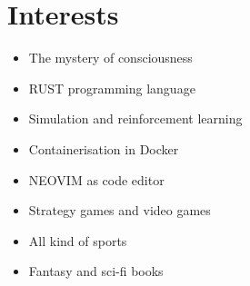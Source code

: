 \documentclass[
	12pt, %
]{../templates/FreemanCV}
\begin{document}
\section{Interests}
\begin{paracol}{2} %
  \begin{itemize}
    \item The mystery of consciousness
    \item RUST programming language
    \item Simulation and reinforcement learning
    \item Containerisation in Docker
  \end{itemize}
\switchcolumn %
\begin{itemize}
    \item NEOVIM as code editor
    \item Strategy games and video games
    \item All kind of sports
    \item Fantasy and sci-fi books
  \end{itemize}

\end{paracol} %
\end{document}

